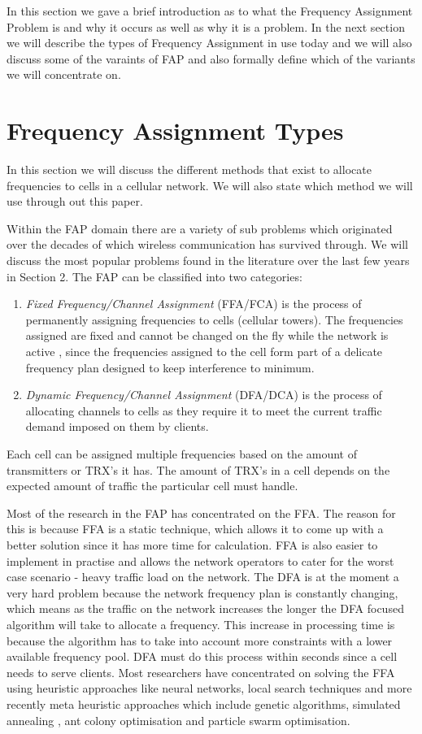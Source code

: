 In this section we gave a brief introduction as to what the Frequency Assignment Problem is and why it occurs as well as why it is a problem. In the next section we will describe the types of Frequency Assignment in use today and we will also discuss some of the varaints of FAP and also formally define which of the variants we will concentrate on.
\section{Frequency Assignment Types}
In this section we will discuss the different methods that exist to allocate frequencies to cells in a cellular network. We will also state which method we will use through out this paper.

Within the FAP domain there are  a variety of sub problems which originated over the decades of which wireless communication has survived through. We will discuss the most popular problems found in the literature over the last few years in Section 2. The FAP can be classified into two categories:
\begin{enumerate}[\bf{(}a\bf{)}]
\item \emph{Fixed Frequency/Channel Assignment} (FFA/FCA) is the process of permanently assigning frequencies to cells (cellular towers). The frequencies assigned are fixed and cannot be changed on the fly while the network is active , since the frequencies assigned to the cell form part of a delicate frequency plan designed to keep interference to minimum.
\item \emph{Dynamic Frequency/Channel Assignment} (DFA/DCA) is the process of allocating channels to cells as they require it to meet the current traffic demand imposed on them by clients. 
\end{enumerate}
Each cell can be assigned multiple frequencies based on the amount of transmitters or TRX's it has. The amount of TRX's in a cell depends on the expected amount of traffic the particular cell must 
handle.

Most of the research in the FAP has concentrated on the FFA. The reason for this is because FFA is a static technique, which allows it to come up with a better solution since it has more time for 
calculation. FFA is also easier to implement in practise and allows the network operators to cater for the worst case scenario - heavy traffic load on the network. The DFA is at the moment a very hard 
problem because the network frequency plan is constantly changing, which means as the traffic on the network increases the longer the DFA focused algorithm will take to allocate a frequency. This 
increase in processing time is because the algorithm has to take into account more constraints with a lower available frequency pool. DFA must do this process within seconds since a cell needs to serve clients. Most researchers have concentrated on solving the FFA using heuristic approaches like neural networks, local search techniques and more recently meta heuristic approaches which include genetic algorithms, simulated annealing , ant colony optimisation and particle swarm optimisation.

